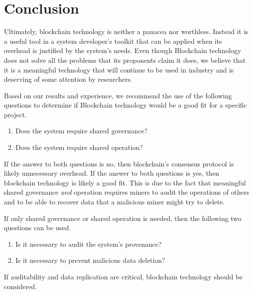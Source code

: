 



\section{Conclusion}

Ultimately, blockchain technology is neither a panacea nor worthless. Instead it is a useful tool in a system developer's toolkit that can be applied when its overhead is justified by the system's needs.
Even though Blockchain technology does not solve all the problems that its  proponents claim it does, we believe that it is a meaningful technology that  will continue to be used in industry and is deserving of some attention by researchers.

Based on our results and experience, we recommend the use of the following 
questions to determine if Blockchain technology would be a good fit for a 
specific project.

\begin{enumerate}
	\item Does the system require shared governance?
	\item Does the system require shared operation?
\end{enumerate}


If the answer to both questions is no, then blockchain's consensus protocol is  likely unnecessary overhead. If the answer to both questions is yes, then blockchain technology is likely a good fit. This is due to the fact that  meaningful shared governance \emph{and} operation requires miners to audit the operations of others and to be able to recover data that a malicious miner might try to delete.

If only shared governance or shared operation is needed, then the following two questions can be used.

\begin{enumerate}[start=3]
	\item Is it necessary to audit the system's provenance?
	\item Is it necessary to prevent malicious data deletion?
\end{enumerate}

If auditability and data replication are critical, blockchain technology should be considered. 

